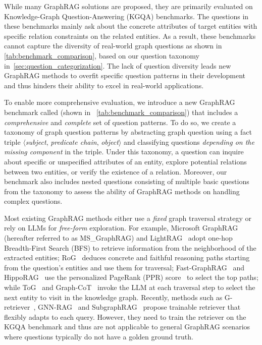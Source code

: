  While many GraphRAG solutions are proposed, they are primarily evaluated on Knowledge-Graph Question-Answering (KGQA) benchmarks. The questions in these benchmarks mainly ask about the concrete attributes of target entities with specific relation constraints on the related entities. As a result, these benchmarks cannot capture the diversity of real-world graph questions as shown in \autoref{tab:benchmark_comparison}, based on our question taxonomy in~\autoref{sec:question_categorization}. %
The lack of question diversity leads new GraphRAG methods to overfit  specific question patterns in their development and thus hinders their ability to excel in real-world applications. 

To enable more comprehensive evaluation, we introduce a new GraphRAG benchmark called \emph{\benchmarkname{}} (shown in ~\autoref{tab:benchmark_comparison}) that includes a \textit{comprehensive} and \textit{complete} set of question patterns. To do so, we create a taxonomy of graph question patterns by abstracting graph question using a fact triple $\langle$\textit{subject}, \textit{predicate chain}, \textit{object}$\rangle$ and classifying questions \textit{depending on the missing component} in the triple. Under this taxonomy, a question can inquire about specific or unspecified attributes of an entity, explore potential relations between two entities, or verify the existence of a relation. Moreover, our benchmark also includes nested questions consisting of multiple basic questions from the taxonomy to assess the ability of GraphRAG methods on handling complex questions.


 Most existing GraphRAG methods either use a \textit{fixed} graph traversal strategy or rely on LLMs for \textit{free-form} exploration. For example, Microsoft GraphRAG~\cite{ms_graphrag} (hereafter referred to as MS\_GraphRAG) and LightRAG~\cite{lightrag} adopt one-hop Breadth-First Search (BFS) to retrieve information from the neighborhood of the extracted entities; RoG~\cite{rog} deduces concrete and faithful reasoning paths starting from the question's entities and use them for traversal; Fast-GraphRAG~\cite{fast_graphrag} and HippoRAG~\cite{hipporag} use the personalized PageRank (PPR) score~\cite{ppr} to select the top paths; while ToG~\cite{tog} and Graph-CoT~\cite{graphcot} invoke the LLM at each traversal step to select the next entity to visit in the knowledge graph. Recently, methods such as G-retriever~\cite{gretriever}, GNN-RAG~\cite{gnnrag} and SubgraphRAG~\cite{subgraphrag} propose trainable retriever that flexibly adapts to each query. However, they need to train the retriever on the KGQA benchmark and thus are not applicable to general GraphRAG scenarios where questions typically do not have a golden ground truth.

